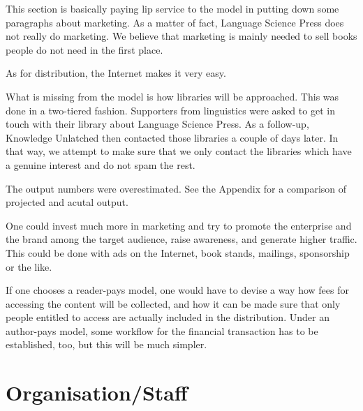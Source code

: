 \documentclass[nonflat,smallfont
]{langsci/langscibook}
\newcommand{\evaluation}[1]{
  \renewcommand{\tblslinecolour}{lsLightOrange}
  \tblssy{receipt}{Evaluation}{\vspace*{-5mm}#1}
}
\newcommand{\othersolutions}[1]{
  \renewcommand{\tblslinecolour}{lsDarkGreenOne}
  \tblssy{more}{Other solutions}{\vspace*{-5mm}#1}
}
\renewcommand{\tblssy}[4][black!12]{%
  \renewcommand{\langscisymbol}{#2}\renewcommand{\tblsboxcolor}{#1}
  \begin{mdframed}[style=yellowexercise,frametitle={#3}]
    #4
  \end{mdframed}
}
\begin{document}
\evaluation{
This section is basically paying lip service to the model in putting down some paragraphs about marketing. As a matter of fact, Language Science Press does not really do marketing. We believe that marketing is mainly needed to sell books people do not need in the first place. 

As for distribution, the Internet makes it very easy.

What is missing from the model is how libraries will be approached. This was done in a two-tiered fashion. Supporters from linguistics were asked to get in touch with their library about Language Science Press. As a follow-up, Knowledge Unlatched then contacted those libraries a couple of days later. In that way, we attempt to make sure that we only contact the libraries which have a genuine interest and do not spam the rest.

The output numbers were overestimated. See the Appendix for a comparison of projected and acutal output. 
}
\othersolutions{ 
One could invest much more in marketing and try to promote the enterprise and the brand among the target audience, raise awareness, and generate higher traffic. This could be done with ads on the Internet, book stands, mailings, sponsorship or the like. 

If one chooses a reader-pays model, one would have to devise a way how fees for accessing the content will be collected, and how it can be made sure that only people entitled to access are actually included in the distribution.  Under an author-pays model, some workflow for the financial transaction has to be established, too, but this will be much simpler. 
}

\chapter{Organisation\slash Staff}
\end{document}

